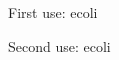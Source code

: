\documentclass{article}
\begin{document}
First use: \ac{ecoli}\par  
Second use: \ac{ecoli}  
\end{document}
